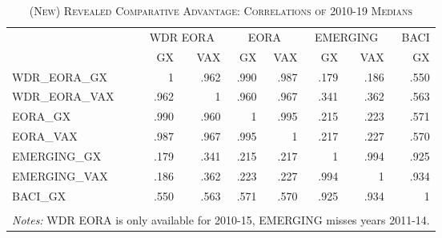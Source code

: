 \documentclass[a4paper]{article}
\begin{document}
\begin{table}[ht]
\centering
\caption{\label{tab:NRCA_corr}\textsc{(New) Revealed Comparative Advantage: Correlations of 2010-19 Medians}}
\vspace{2mm}
\begin{tabular}{lrrrrrrr}
  \toprule
  & \multicolumn{2}{c}{WDR EORA} & \multicolumn{2}{c}{EORA} & \multicolumn{2}{c}{EMERGING} & BACI \\
 & GX & VAX & GX & VAX & GX & VAX & GX \\ 
  \midrule
  WDR\_EORA\_GX &    1   &  .962 &  .990 &  .987 &  .179 &  .186 &  .550 \\ 
  WDR\_EORA\_VAX &  .962 &    1   &  .960 &  .967 &  .341 &  .362 &  .563 \\ 
  EORA\_GX &  .990 &  .960 &    1   &  .995 &  .215 &  .223 &  .571 \\ 
  EORA\_VAX &  .987 &  .967 &  .995 &    1   &  .217 &  .227 &  .570 \\ 
  EMERGING\_GX &  .179 &  .341 &  .215 &  .217 &    1   &  .994 &  .925 \\ 
  EMERGING\_VAX &  .186 &  .362 &  .223 &  .227 &  .994 &    1   &  .934 \\ 
  BACI\_GX &  .550 &  .563 &  .571 &  .570 &  .925 &  .934 &    1   \\ 
   \bottomrule \\ [-0.9em]
\multicolumn{8}{l}{\parbox{0.7\textwidth}{\scriptsize
\textit{Notes:} WDR EORA is only available for 2010-15, EMERGING misses years 2011-14.}}
\end{tabular}
\end{table}


\end{document}

